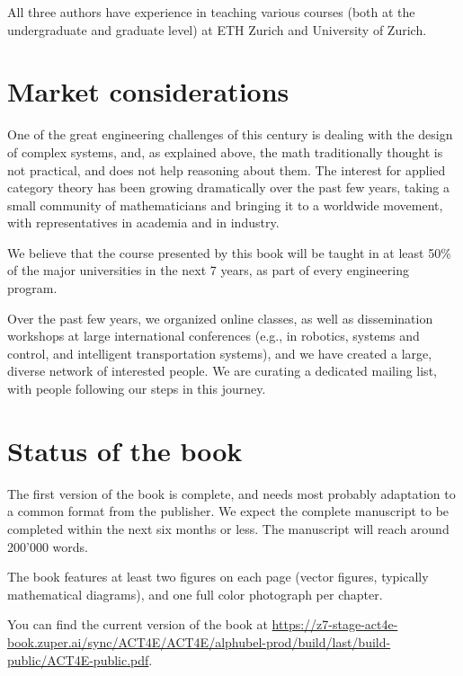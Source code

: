 \documentclass[10pt, article, one side]{memoir}
\begin{document}
    All three authors have experience in teaching various courses (both at the undergraduate and graduate level) at ETH Zurich and University of Zurich.

    \section{Market considerations}
    One of the great engineering challenges of this century is dealing with the design of complex systems, and, as explained above, the math traditionally thought is not practical, and does not help reasoning about them.
    The interest for applied category theory has been growing dramatically over the past few years, taking a small community of mathematicians and bringing it to a worldwide movement, with representatives in academia and in industry.

    We believe that the course presented by this book will be taught in at least 50\% of the major universities in the next 7 years, as part of every engineering program.

    Over the past few years, we organized online classes, as well as dissemination workshops at large international conferences (e.g., in robotics, systems and control, and intelligent transportation systems), and we have created a large, diverse network of interested people.
    We are curating a dedicated mailing list, with people following our steps in this journey.

    \section{Status of the book}
    The first version of the book is complete, and needs most probably adaptation to a common format from the publisher.
    We expect the complete manuscript to be completed within the next six months or less.
    The manuscript will reach around 200’000 words.

    The book features at least two figures on each page (vector figures, typically mathematical diagrams), and one full color photograph per chapter.

    You can find the current version of the book at \href{https://z7-stage-act4e-book.zuper.ai/sync/ACT4E/ACT4E/alphubel-prod/build/last/build-public/ACT4E-public.pdf}{https://z7-stage-act4e-book.zuper.ai/sync/ACT4E/ACT4E/alphubel-prod/build/last/build-public/ACT4E-public.pdf}.
\end{document}
